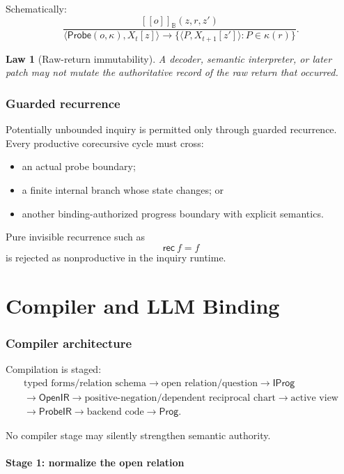 \documentclass[11pt,oneside]{article}
\newtheorem{law}[definition]{Law}
\newcommand{\B}{\mathbb B}
\newcommand{\Prog}{\mathsf{Prog}}
\newcommand{\OpenIR}{\mathsf{OpenIR}}
\newcommand{\ProbeIR}{\mathsf{ProbeIR}}
\newcommand{\den}[1]{[\![#1]\!]}
\begin{document}
Schematically:
\[
\frac{
\den{o}_{\B}(z,r,z')
}{
\langle\mathsf{Probe}(o,\kappa),X_t[z]\rangle
\longrightarrow
\{
\langle P,X_{t+1}[z']\rangle:
P\in\kappa(r)
\}
}.
\]

\begin{law}[Raw-return immutability]
A decoder, semantic interpreter, or later patch may not mutate the authoritative record of the raw return that occurred.
\end{law}

\section{Guarded recurrence}

Potentially unbounded inquiry is permitted only through guarded recurrence.  Every productive corecursive cycle must cross:
\begin{itemize}
\item an actual probe boundary;
\item a finite internal branch whose state changes; or
\item another binding-authorized progress boundary with explicit semantics.
\end{itemize}

Pure invisible recurrence such as
\[
\mathsf{rec}\ f=f
\]
is rejected as nonproductive in the inquiry runtime.

\part{Compiler and LLM Binding}

\section{Compiler architecture}

Compilation is staged:
\[
\boxed{
\begin{gathered}
\text{typed forms/relation schema}\to\text{open relation/question}\to\mathsf{IProg}\\
\to\OpenIR\to\text{positive-negation/dependent reciprocal chart}\to\text{active view}\\
\to\ProbeIR\to\text{backend code}\to\Prog.
\end{gathered}
}
\]

No compiler stage may silently strengthen semantic authority.

\subsection{Stage 1: normalize the open relation}
\end{document}

